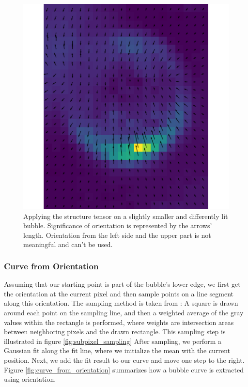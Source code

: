 					
			\begin{figure}
				\includegraphics[scale=0.5]{images/struct_tensor_result_2.png}
				\caption{Applying the structure tensor on a slightly smaller and differently lit bubble. Significance of orientation is represented by the arrows' length. Orientation from the left side and the upper part is not meaningful and can't be used.}
				\label{fig:struct_tensor_result_2}
			\end{figure}
	
	
	
	
	
	
	
			\subsubsection{Curve from Orientation}
				Assuming that our starting point is part of the bubble's lower edge, we first get the orientation at the current pixel and then sample points on a line segment along this orientation. The sampling method is taken from \citet{Bopp2018}: A square is drawn around each point on the sampling line, and then a weighted average of the gray values within the rectangle is performed, where weights are intersection areas between neighboring pixels and the drawn rectangle. This sampling step is illustrated in figure \ref{fig:subpixel_sampling}
				 After sampling, we perform a Gaussian fit along the fit line, where we initialize the mean with the current position. Next, we add the fit result to our curve and move one step to the right. Figure \ref{fig:curve_from_orientation} summarizes how a bubble curve is extracted using orientation. 
				 
